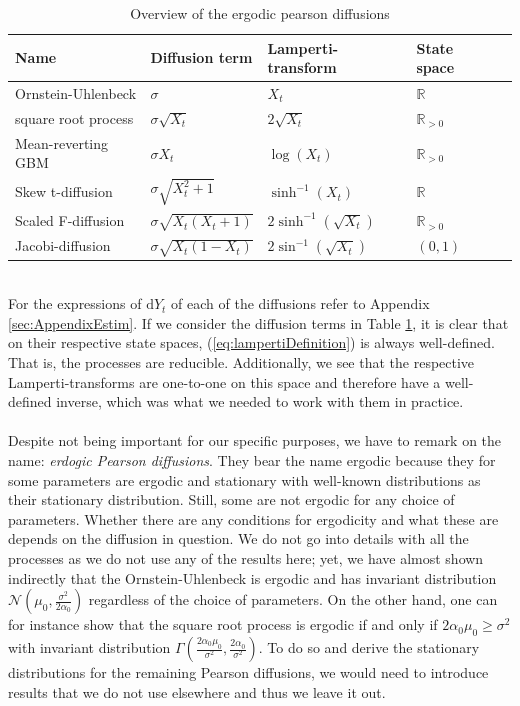\begin{table}[h!]
    \begin{center}
    \begin{tabular}{lllll}\hline
    \textbf{Name} & \textbf{Diffusion term} & \textbf{Lamperti-transform} & \textbf{State space}\\ \hline
    Ornstein-Uhlenbeck  & $\sigma$  & $X_t$ & $\mathbb{R}$ \\
    square root process & $\sigma\sqrt{X_t}$  & $ 2\sqrt{X_t}$ & $\mathbb{R}_{>0}$ \\
    Mean-reverting GBM  & $\sigma X_t $  & $ \log\left(X_t\right)$  & $\mathbb{R}_{>0}$ \\
    Skew t-diffusion  & $\sigma\sqrt{X_t^2 + 1}$  & $ \sinh^{-1}(X_t)$ & $\mathbb{R}$\\
    Scaled F-diffusion  & $\sigma\sqrt{X_t\left(X_t + 1\right)}$  & $ 2\sinh^{-1}\left(\sqrt{X_t}\right)$ & $\mathbb{R}_{>0}$ \\
    Jacobi-diffusion  & $\sigma\sqrt{X_t\left(1 - X_t\right)}$  & $ 2\sin^{-1}\left(\sqrt{X_t}\right)$ & $(0, 1)$ \\ \hline
    \end{tabular}
    \caption{Overview of the ergodic pearson diffusions}
    \label{table:ergodicDiffusions}
\end{center}
\end{table}\\
For the expressions of $\mathrm{d}Y_t$ of each of the diffusions refer to Appendix \ref{sec:AppendixEstim}. If we consider the diffusion terms in Table \ref{table:ergodicDiffusions}, it is clear that on their respective state spaces, (\ref{eq:lampertiDefinition}) is always well-defined. That is, the processes are reducible. Additionally, we see that the respective Lamperti-transforms are one-to-one on this space and therefore have a well-defined inverse, which was what we needed to work with them in practice. \\\\
Despite not being important for our specific purposes, we have to remark on the name: \textit{erdogic Pearson diffusions}. They bear the name ergodic because they for some parameters are ergodic and stationary with well-known distributions as their stationary distribution. Still, some are not ergodic for any choice of parameters. Whether there are any conditions for ergodicity and what these are depends on the diffusion in question. We do not go into details with all the processes as we do not use any of the results here; yet, we have almost shown indirectly that the Ornstein-Uhlenbeck is ergodic and has invariant distribution $\mathcal{N}\left(\mu_0, \frac{\sigma^2}{2\alpha_0}\right)$ regardless of the choice of parameters. On the other hand, one can for instance show that the square root process is ergodic if and only if $2\alpha_0\mu_0\geq \sigma^2$ with invariant distribution $\Gamma\left(\frac{2\alpha_0\mu_0}{\sigma^2}, \frac{2\alpha_0}{\sigma^2}\right)$. To do so and derive the stationary distributions for the remaining Pearson diffusions, we would need to introduce results that we do not use elsewhere and thus we leave it out. 


